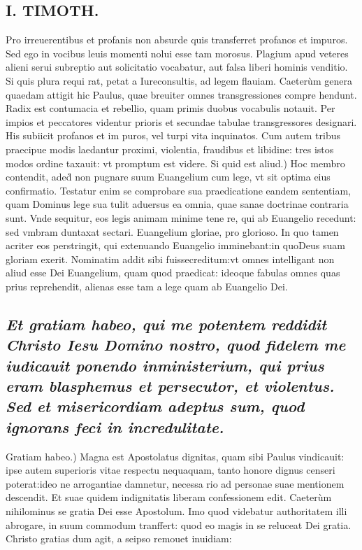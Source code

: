 \documentclass{article}
\begin{document}
\begin{pages}
\section*{I. TIMOTH. }
\marginpar{[ p.8 ]}\pstart Pro irreuerentibus et profanis non absurde quis transferret profanos et impuros. Sed ego in vocibus leuis momenti nolui esse tam morosus. Plagium apud veteres alieni serui subreptio aut solicitatio vocabatur, aut falsa liberi hominis venditio. Si quis plura requi rat, petat a Iureconsultis, ad legem flauiam. Caeterùm genera quaedam attigit hic Paulus, quae breuiter omnes transgressiones compre hendunt. Radix est contumacia et rebellio, quam primis duobus vocabulis notauit. Per impios et peccatores videntur prioris et secundae tabulae transgressores designari. His subiicit profanos et im puros, vel turpi vita inquinatos. Cum autem tribus praecipue modis laedantur proximi, violentia, fraudibus et libidine: tres istos modos ordine taxauit: vt promptum est videre.  \pend\pstart Si quid est aliud.) Hoc membro contendit, aded̀ non pugnare suum Euangelium cum lege, vt sit optima eius confirmatio. Testatur enim se comprobare sua praedicatione eandem sententiam, quam Dominus lege sua tulit aduersus ea omnia, quae sanae doctrinae contraria sunt. Vnde sequitur, eos legis animam minime tene re, qui ab Euangelio recedunt: sed vmbram duntaxat sectari. Euangelium gloriae, pro glorioso. In quo tamen acriter eos perstringit, qui extenuando Euangelio imminebant:in quoDeus suam gloriam exerit. Nominatim addit sibi fuissecreditum:vt omnes intelligant non aliud esse Dei Euangelium, quam quod praedicat: ideoque fabulas omnes quas prius reprehendit, alienas esse tam a lege quam ab Euangelio Dei.  \pend
{}
{}
\subsection*{\textit{Et gratiam habeo, qui me potentem reddidit Christo Iesu Domino nostro, quod fidelem me iudicauit ponendo inministerium, qui prius eram blasphemus et persecutor, et violentus. Sed et misericordiam adeptus sum, quod ignorans feci in incredulitate. }}\pstart Gratiam habeo.) Magna est Apostolatus dignitas, quam sibi Paulus vindicauit: ipse autem superioris vitae respectu nequaquam, tanto honore dignus censeri poterat:ideo ne arrogantiae damnetur, necessa rio ad personae suae mentionem descendit. Et suae quidem indignitatis liberam confessionem edit. Caeterùm nihilominus se gratia Dei esse Apostolum. Imo quod videbatur authoritatem illi abrogare, in suum commodum tranffert: quod eo magis in se reluceat Dei gratia. Christo gratias dum agit, a seipso remouet inuidiam:  \pend

\end{pages}
\end{document}
